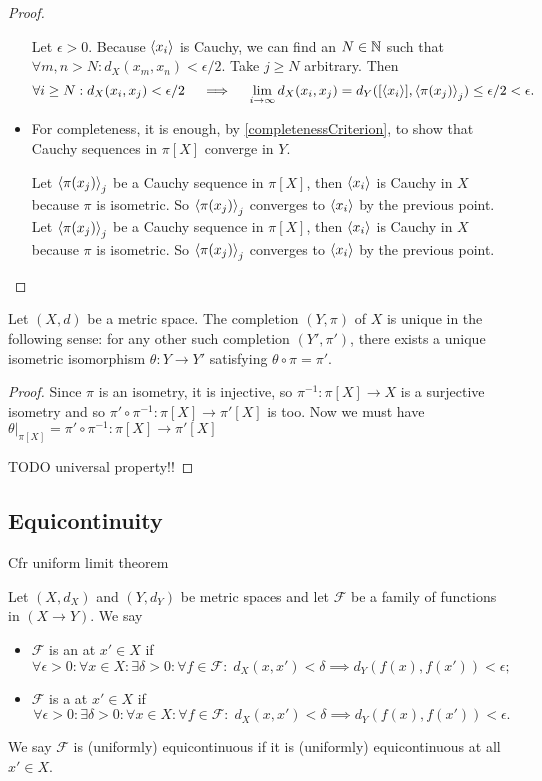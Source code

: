 \begin{proof}
\begin{itemize}
Let $\epsilon>0$. Because $\left\langle x_i \right\rangle$ is Cauchy, we can find an $N\in\mathbb{N}$ such that $\forall m,n>N: d_X(x_m,x_n) < \epsilon/2$. Take $j\geq N$ arbitrary. Then
\[ \forall i\geq N: d_X(x_i,x_j) < \epsilon/2 \quad \implies\quad \lim_{i\to\infty} d_X(x_i,x_j) = d_Y([\left\langle x_i \right\rangle],\left\langle \pi(x_j) \right\rangle_j) \leq \epsilon/2  < \epsilon. \]
\item For completeness, it is enough, by \ref{completenessCriterion}, to show that Cauchy sequences in $\pi[X]$ converge in $Y$.

Let $\left\langle \pi(x_j) \right\rangle_j$ be a Cauchy sequence in $\pi[X]$, then $\left\langle x_i \right\rangle$ is Cauchy in $X$ because $\pi$ is isometric. So $\left\langle \pi(x_j) \right\rangle_j$ converges to $\left\langle x_i \right\rangle$ by the previous point.
Let $\left\langle \pi(x_j) \right\rangle_j$ be a Cauchy sequence in $\pi[X]$, then $\left\langle x_i \right\rangle$ is Cauchy in $X$ because $\pi$ is isometric. So $\left\langle \pi(x_j) \right\rangle_j$ converges to $\left\langle x_i \right\rangle$ by the previous point.
\end{itemize}
\end{proof}

\begin{proposition}
Let $(X,d)$ be a metric space. The completion $(Y,\pi)$ of $X$ is unique in the following sense: for any other such completion $(Y',\pi')$, there exists a unique isometric isomorphism $\theta:Y\to Y'$ satisfying $\theta\circ \pi = \pi'$.
\end{proposition}
\begin{proof}
Since $\pi$ is an isometry, it is injective, so $\pi^{-1}:\pi[X]\to X$ is a surjective isometry and so $\pi'\circ\pi^{-1}:\pi[X]\to\pi'[X]$ is too. Now we must have $\theta|_{\pi[X]} = \pi'\circ\pi^{-1}:\pi[X]\to\pi'[X]$ 

TODO universal property!!
\end{proof}



\subsection{Equicontinuity}
Cfr uniform limit theorem
\begin{definition}
Let $(X,d_X)$ and $(Y,d_Y)$ be metric spaces and let $\mathcal{F}$ be a family of functions in $(X\to Y)$.
We say
\begin{itemize}
\item $\mathcal{F}$ is an  at $x'\in X$ if
\[ \forall \epsilon> 0: \forall x\in X: \exists \delta>0: \forall f\in\mathcal{F}:\; d_X(x,x') < \delta \implies d_Y(f(x),f(x')) < \epsilon; \]
\item $\mathcal{F}$ is a  at $x'\in X$ if
\[ \forall \epsilon> 0: \exists \delta>0: \forall x\in X: \forall f\in\mathcal{F}:\; d_X(x,x') < \delta \implies d_Y(f(x),f(x')) < \epsilon. \]
\end{itemize}
We say $\mathcal{F}$ is (uniformly) equicontinuous if it is (uniformly) equicontinuous at all $x'\in X$.
\end{definition}

